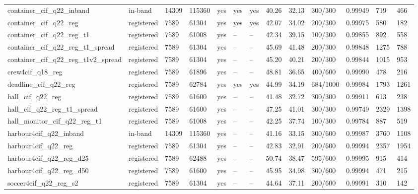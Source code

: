 \begin{table}[t]
{\begin{tabular}{lllllllllllll}
container\_cif\_q22\_inband & in-band & 14309 & 115360 & yes & yes & yes & 40.26 & 32.13 & 300/300 & 0.99949 & 719 & 466 \\
container\_cif\_q22\_reg & registered & 7589 & 61304 & yes & yes & yes & 42.07 & 34.02 & 200/300 & 0.99975 & 580 & 182 \\
container\_cif\_q22\_reg\_t1 & registered & 7589 & 61008 & yes & -- & -- & 42.34 & 39.15 & 100/300 & 0.99855 & 892 & 558 \\
container\_cif\_q22\_reg\_t1\_spread & registered & 7589 & 61304 & yes & -- & -- & 45.69 & 41.48 & 200/300 & 0.99848 & 1275 & 788 \\
container\_cif\_q22\_reg\_t1v2\_spread & registered & 7589 & 61304 & yes & -- & -- & 45.20 & 40.21 & 200/300 & 0.99844 & 1015 & 953 \\
crew4cif\_q18\_reg & registered & 7589 & 61896 & yes & -- & -- & 48.81 & 36.65 & 400/600 & 0.99990 & 478 & 216 \\
deadline\_cif\_q22\_reg & registered & 7589 & 62784 & yes & yes & yes & 44.99 & 34.19 & 684/1000 & 0.99984 & 1793 & 1261 \\
hall\_cif\_q22\_reg & registered & 7589 & 61600 & yes & -- & -- & 41.48 & 32.72 & 300/300 & 0.99911 & 613 & 238 \\
hall\_cif\_q22\_reg\_t1\_spread & registered & 7589 & 61600 & yes & -- & -- & 47.25 & 41.01 & 300/300 & 0.99749 & 2329 & 1398 \\
hall\_monitor\_cif\_q22\_reg\_t1 & registered & 7589 & 61008 & yes & -- & -- & 42.25 & 37.74 & 100/300 & 0.99784 & 887 & 519 \\
harbour4cif\_q22\_inband & in-band & 14309 & 115360 & yes & -- & -- & 41.16 & 33.15 & 300/600 & 0.99987 & 3760 & 1108 \\
harbour4cif\_q22\_reg & registered & 7589 & 61304 & yes & -- & -- & 42.83 & 32.91 & 200/600 & 0.99994 & 2357 & 1954 \\
harbour4cif\_q22\_reg\_d25 & registered & 7589 & 62488 & yes & -- & -- & 50.74 & 38.47 & 595/600 & 0.99995 & 915 & 414 \\
harbour4cif\_q22\_reg\_d50 & registered & 7589 & 61600 & yes & -- & -- & 45.95 & 34.98 & 300/600 & 0.99994 & 471 & 215 \\
soccer4cif\_q22\_reg\_s2 & registered & 7589 & 61304 & yes & -- & -- & 44.64 & 37.11 & 200/600 & 0.99991 & 310 & 142 \\
\bottomrule
\end{tabular}}
\end{table}
